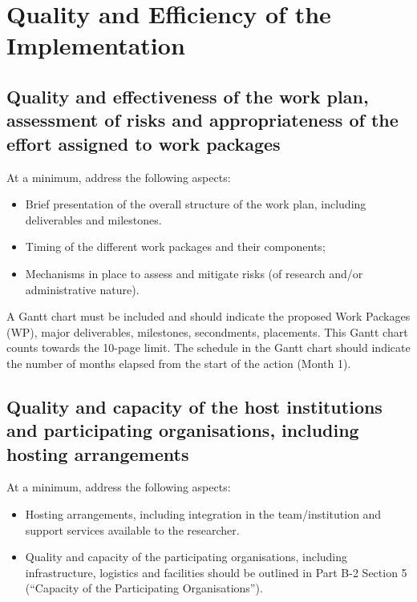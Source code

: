 \documentclass[11pt,draftproposal]{msca-pf}
\begin{document}
\section{Quality and Efficiency of the Implementation}

\subsection{Quality and effectiveness of the work plan, assessment of risks and
appropriateness of the effort assigned to work packages}

At a minimum, address the following aspects:

\begin{itemize}
    \item Brief presentation of the overall structure of the work plan,
    including deliverables and milestones.

    \item Timing of the different work packages and their components;

    \item Mechanisms in place to assess and mitigate risks (of research and/or
    administrative nature).
\end{itemize}

A Gantt chart must be included and should indicate the proposed Work Packages
(WP), major deliverables, milestones, secondments, placements. This Gantt chart
counts towards the 10-page limit. The schedule in the Gantt chart should indicate
the number of months elapsed from the start of the action (Month 1).

\subsection{Quality and capacity of the host institutions and participating
organisations, including hosting arrangements}

At a minimum, address the following aspects:

\begin{itemize}
    \item Hosting arrangements, including integration in the team/institution
    and support services available to the researcher.

    \item Quality and capacity of the participating organisations, including
    infrastructure, logistics and facilities should be outlined in Part B-2
    Section 5 (``Capacity of the Participating Organisations'').
\end{itemize}
\end{document}
